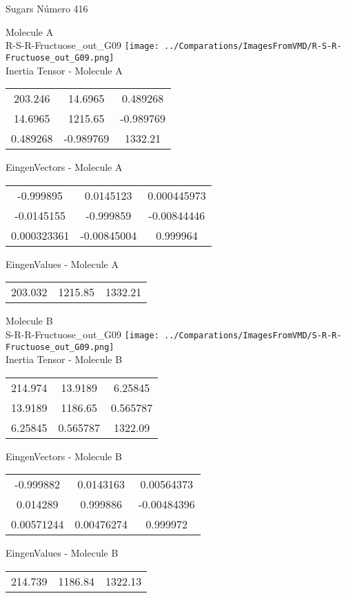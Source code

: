 \vtab[-2cm]
\begin{center}
{\large Sugars \tab Número 416}
\end{center}
\begin{multicols}{2}
\begin{center}

Molecule A \\ 
R-S-R-Fructuose\_out\_G09
\texttt{[image: ../Comparations/ImagesFromVMD/R-S-R-Fructuose\_out\_G09.png]}
\\
Inertia Tensor - Molecule A \\
\vtab

\begin{tabular}{|c c c|}
203.246	 & 	14.6965	 & 	0.489268	 \\
14.6965	 & 	1215.65	 & 	-0.989769	 \\
0.489268	 & 	-0.989769	 & 	1332.21
\end{tabular}

\vtab
 EingenVectors - Molecule A     \\
\vtab
\begin{tabular}{|c c c|}
-0.999895	 & 	0.0145123	 & 	0.000445973	 \\
-0.0145155	 & 	-0.999859	 & 	-0.00844446	 \\
0.000323361	 & 	-0.00845004	 & 	0.999964
\end{tabular}

\vtab
 EingenValues - Molecule A     \\
\vtab
\begin{tabular}{|c c c|}
203.032	 & 	1215.85	 & 	1332.21	 \\
\end{tabular}
\columnbreak

Molecule B \\ 
S-R-R-Fructuose\_out\_G09
\texttt{[image: ../Comparations/ImagesFromVMD/S-R-R-Fructuose\_out\_G09.png]}
\\
Inertia Tensor - Molecule B \\
\vtab

\begin{tabular}{|c c c|}
214.974	 & 	13.9189	 & 	6.25845	 \\
13.9189	 & 	1186.65	 & 	0.565787	 \\
6.25845	 & 	0.565787	 & 	1322.09
\end{tabular}

\vtab
 EingenVectors - Molecule B     \\
\vtab
\begin{tabular}{|c c c|}
-0.999882	 & 	0.0143163	 & 	0.00564373	 \\
0.014289	 & 	0.999886	 & 	-0.00484396	 \\
0.00571244	 & 	0.00476274	 & 	0.999972
\end{tabular}

\vtab
 EingenValues - Molecule B     \\
\vtab
\begin{tabular}{|c c c|}
214.739	 & 	1186.84	 & 	1322.13	 \\
\end{tabular}

\end{center}
\end{multicols}
